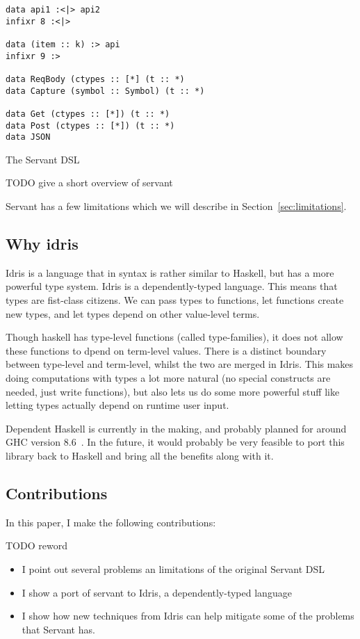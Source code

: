 \documentclass[12pt,a4paper]{article}
\begin{document}
\begin{listing}[H]
\begin{verbatim}
data api1 :<|> api2
infixr 8 :<|>

data (item :: k) :> api
infixr 9 :>

data ReqBody (ctypes :: [*] (t :: *)
data Capture (symbol :: Symbol) (t :: *)

data Get (ctypes :: [*]) (t :: *)
data Post (ctypes :: [*]) (t :: *)
data JSON
\end{verbatim}
\caption{The Servant DSL}
\label{lab:servant}
\end{listing}

TODO give a short overview of servant



Servant has a few limitations which we will describe in Section~\ref{sec:limitations}. 


\subsection{Why idris}
Idris is a language that in syntax is rather similar to Haskell, but has a more powerful type system. Idris is a dependently-typed language. This means that types are fist-class citizens. We can pass types to functions, let functions create new types, and let types depend on other value-level terms.

Though haskell has type-level functions (called type-families), it does not allow these functions to dpend on term-level values. There is a distinct boundary between type-level and term-level, whilst the two are merged in Idris. This makes doing computations with types a lot more natural (no special constructs are needed, just write functions), but also lets us do some more powerful stuff like letting types actually depend on runtime user input.

Dependent Haskell is currently in the making, and probably planned for around GHC version 8.6~\cite{neeeded}. In the future, it would probably be very feasible to port this library back to Haskell and bring all the benefits along with it.

\subsection{Contributions}
In this paper, I make the following contributions:

TODO reword
\begin{itemize}
  \item I point out several problems an limitations of the original Servant DSL
  \item I show a port of servant to Idris, a dependently-typed language
  \item I show how new techniques from Idris can help mitigate some of the problems that Servant has.
\end{itemize}
\end{document}
